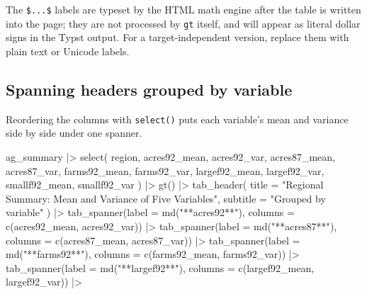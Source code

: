 \documentclass[
  letterpaper,
  DIV=11,
  numbers=noendperiod]{scrreprt}
\newenvironment{Shaded}{\begin{snugshade}}{\end{snugshade}}
\newcommand{\AttributeTok}[1]{\textcolor[rgb]{0.40,0.45,0.13}{#1}}
\newcommand{\FunctionTok}[1]{\textcolor[rgb]{0.28,0.35,0.67}{#1}}
\newcommand{\NormalTok}[1]{\textcolor[rgb]{0.00,0.23,0.31}{#1}}
\newcommand{\SpecialCharTok}[1]{\textcolor[rgb]{0.37,0.37,0.37}{#1}}
\newcommand{\StringTok}[1]{\textcolor[rgb]{0.13,0.47,0.30}{#1}}
\renewcommand{\[}{\begin{equation}}
\renewcommand{\]}{\end{equation}}
\begin{document}
The \texttt{\$...\$} labels are typeset by the HTML math engine after
the table is written into the page; they are not processed by
\texttt{gt} itself, and will appear as literal dollar signs in the Typst
output. For a target-independent version, replace them with plain text
or Unicode labels.

\subsection{Spanning headers grouped by
variable}\label{spanning-headers-grouped-by-variable}

Reordering the columns with \texttt{select()} puts each variable's mean
and variance side by side under one spanner.

\begin{Shaded}
\begin{Highlighting}[]
\NormalTok{ag\_summary }\SpecialCharTok{|\textgreater{}}
  \FunctionTok{select}\NormalTok{(}
\NormalTok{    region,}
\NormalTok{    acres92\_mean,  acres92\_var,}
\NormalTok{    acres87\_mean,  acres87\_var,}
\NormalTok{    farms92\_mean,  farms92\_var,}
\NormalTok{    largef92\_mean, largef92\_var,}
\NormalTok{    smallf92\_mean, smallf92\_var}
\NormalTok{  ) }\SpecialCharTok{|\textgreater{}}
  \FunctionTok{gt}\NormalTok{() }\SpecialCharTok{|\textgreater{}}
  \FunctionTok{tab\_header}\NormalTok{(}
    \AttributeTok{title =} \StringTok{"Regional Summary: Mean and Variance of Five Variables"}\NormalTok{,}
    \AttributeTok{subtitle =} \StringTok{"Grouped by variable"}
\NormalTok{  ) }\SpecialCharTok{|\textgreater{}}
  \FunctionTok{tab\_spanner}\NormalTok{(}\AttributeTok{label =} \FunctionTok{md}\NormalTok{(}\StringTok{"**acres92**"}\NormalTok{),  }\AttributeTok{columns =} \FunctionTok{c}\NormalTok{(acres92\_mean, acres92\_var)) }\SpecialCharTok{|\textgreater{}}
  \FunctionTok{tab\_spanner}\NormalTok{(}\AttributeTok{label =} \FunctionTok{md}\NormalTok{(}\StringTok{"**acres87**"}\NormalTok{),  }\AttributeTok{columns =} \FunctionTok{c}\NormalTok{(acres87\_mean, acres87\_var)) }\SpecialCharTok{|\textgreater{}}
  \FunctionTok{tab\_spanner}\NormalTok{(}\AttributeTok{label =} \FunctionTok{md}\NormalTok{(}\StringTok{"**farms92**"}\NormalTok{),  }\AttributeTok{columns =} \FunctionTok{c}\NormalTok{(farms92\_mean, farms92\_var)) }\SpecialCharTok{|\textgreater{}}
  \FunctionTok{tab\_spanner}\NormalTok{(}\AttributeTok{label =} \FunctionTok{md}\NormalTok{(}\StringTok{"**largef92**"}\NormalTok{), }\AttributeTok{columns =} \FunctionTok{c}\NormalTok{(largef92\_mean, largef92\_var)) }\SpecialCharTok{|\textgreater{}}

\end{Highlighting}
\end{Shaded}
\end{document}
